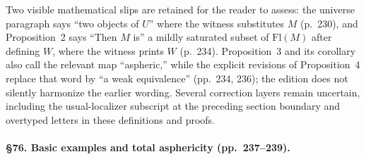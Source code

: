 Two visible mathematical slips are retained for the reader to assess: the universe paragraph says “two objects of $U$” where the witness substitutes $M$ (p.\ 230), and Proposition~2 says “Then $M$ is” a mildly saturated subset of $\mathrm{Fl}(M)$ after defining $W$, where the witness prints $W$ (p.\ 234). Proposition~3 and its corollary also call the relevant map “aspheric,” while the explicit revisions of Proposition~4 replace that word by “a weak equivalence” (pp.\ 234, 236); the edition does not silently harmonize the earlier wording. Several correction layers remain uncertain, including the usual-localizer subscript at the preceding section boundary and overtyped letters in these definitions and proofs.

\paragraph{\S76. Basic examples and total asphericity (pp.\ 237--239).}
